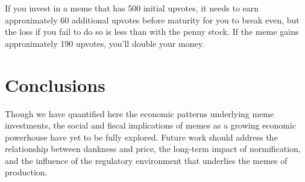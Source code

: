 \documentclass[a4paper, 12pt]{article}
\begin{document}
If you invest in a meme that has 500 initial upvotes, it needs to earn approximately 60
additional upvotes before maturity for you to break even, but the loss if you
fail to do so is less than with the penny stock. If the meme gains approximately
190 upvotes, you'll double your money.

\section*{Conclusions}
\label{sec:org22ed6c2}

Though we have quantified here the economic patterns underlying meme investments, the
social and fiscal implications of memes as a growing economic powerhouse have
yet to be fully explored. Future work should address the relationship between
dankness and price, the long-term impact of normification, and the influence of
the regulatory environment that underlies the memes of production.



\end{document}
